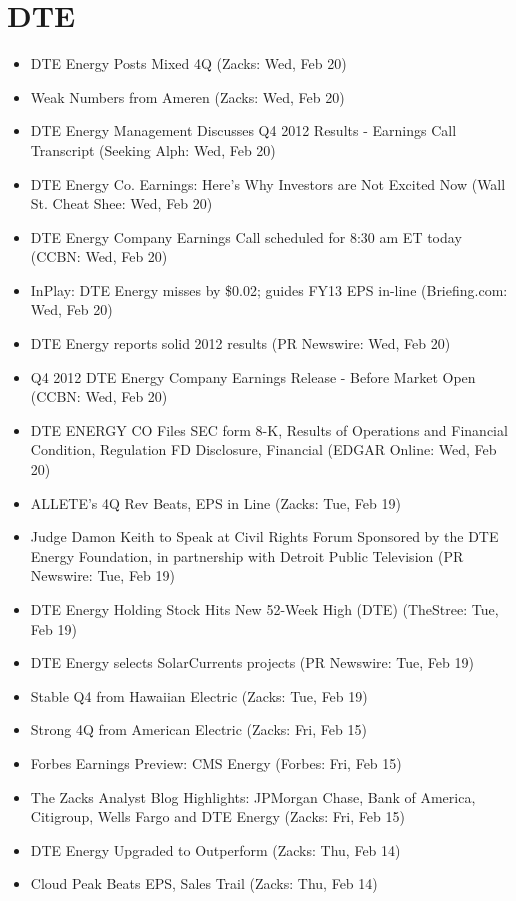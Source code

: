 \documentclass[11pt,asymmetric]{article}
\begin{document}
\section*{DTE}
\begin{itemize}
\item DTE Energy Posts Mixed 4Q (Zacks: Wed, Feb 20)
\item Weak Numbers from Ameren (Zacks: Wed, Feb 20)
\item DTE Energy Management Discusses Q4 2012 Results - Earnings Call Transcript (Seeking Alph: Wed, Feb 20)
\item DTE Energy Co. Earnings: Here’s Why Investors are Not Excited Now (Wall St. Cheat Shee: Wed, Feb 20)
\item DTE Energy Company Earnings Call scheduled for 8:30 am ET today (CCBN: Wed, Feb 20)
\item InPlay: DTE Energy misses by \$0.02; guides FY13 EPS in-line (Briefing.com: Wed, Feb 20)
\item DTE Energy reports solid 2012 results (PR Newswire: Wed, Feb 20)
\item Q4 2012 DTE Energy Company Earnings Release - Before Market Open (CCBN: Wed, Feb 20)
\item DTE ENERGY CO Files SEC form 8-K, Results of Operations and Financial Condition, Regulation FD Disclosure, Financial (EDGAR Online: Wed, Feb 20)
\item ALLETE's 4Q Rev Beats, EPS in Line (Zacks: Tue, Feb 19)
\item Judge Damon Keith to Speak at Civil Rights Forum Sponsored by the DTE Energy Foundation, in partnership with Detroit Public Television (PR Newswire: Tue, Feb 19)
\item DTE Energy Holding Stock Hits New 52-Week High (DTE) (TheStree: Tue, Feb 19)
\item DTE Energy selects SolarCurrents projects (PR Newswire: Tue, Feb 19)
\item Stable Q4 from Hawaiian Electric (Zacks: Tue, Feb 19)
\item Strong 4Q from American Electric (Zacks: Fri, Feb 15)
\item Forbes Earnings Preview: CMS Energy (Forbes: Fri, Feb 15)
\item The Zacks Analyst Blog Highlights: JPMorgan Chase, Bank of America, Citigroup, Wells Fargo and DTE Energy (Zacks: Fri, Feb 15)
\item DTE Energy Upgraded to Outperform (Zacks: Thu, Feb 14)
\item Cloud Peak Beats EPS, Sales Trail (Zacks: Thu, Feb 14)

\end{itemize}
\end{document}
